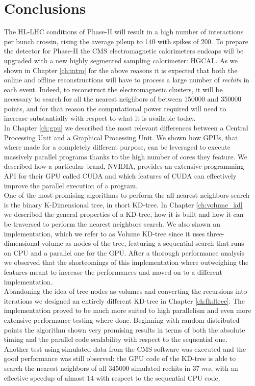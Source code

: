 \chapter{Conclusions}\label{ch:conclusion}
The HL-LHC conditions of Phase-II will result in a high number of interactions per bunch crossin, rising the average pileup to 140 with spikes of 200. To prepare the detector for Phase-II the CMS electromagnetic calorimeters endcaps will be upgraded with a new highly segmented sampling calorimeter: HGCAL. As we shown in Chapter \ref{ch:intro} for the above reasons it is expected that both the online and offline reconstructions will have to process a large number of \textit{rechits} in each event. Indeed, to reconstruct the electromagnetic clusters, it will be necessary to search for all the nearest neighbors of between 150000 and 350000 points, and for that reason the computational power required will need to increase substantially with respect to what it is available today.
\vspace{0.5cm}
\\
In Chapter \ref{ch:gpu} we described the most relevant differences between a Central Processing Unit and a Graphical Processing Unit. We shown how GPUs, that where made for a completely different purpose, can be leveraged to execute massively parallel programs thanks to the high number of cores they feature. We described how a particular brand, NVIDIA, provides an extensive programming API for their GPU called CUDA and which features of CUDA can effectively improve the parallel execution of a program.
\vspace{0.5cm}
\\
One of the most promising algorithms to perform the all nearest neighbors search is the binary K-Dimensional tree, in short KD-tree. In Chapter \ref{ch:volume_kd} we described the general properties of a KD-tree, how it is built and how it can be traversed to perform the nearest neighbors search. We also shown an implementation, which we refer to as Volume KD-tree since it uses three-dimensional volume as nodes of the tree, featuring a sequential search that runs on CPU and a parallel one for the GPU. After a thorough performance analysis we observed that the shortcomings of this implementation where outweighing the features meant to increase the performances and moved on to a different implementation.
\vspace{0.5cm}
\\
Abandoning the idea of tree nodes as volumes and converting the recursions into iterations we designed an entirely different KD-tree in Chapter \ref{ch:fkdtree}. The implementation proved to be much more suited to high parallelism and even more extensive performance testing where done. Beginning with random distributed points the algorithm shown very promising results in terms of both the absolute timing and the parallel code scalability with respect to the sequential one. Another test using simulated data from the CMS software was executed and the good performance was still observed: the GPU code of the KD-tree is able to search the nearest neighbors of all 345000 simulated rechits in 37 $\unit{ms}$, with an effective speedup of almost 14 with respect to the sequential CPU code.
